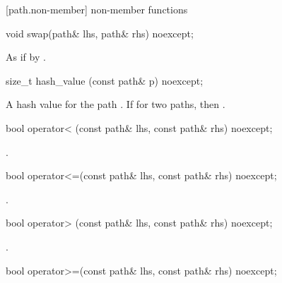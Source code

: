 [path.non-member]{ non-member functions}

\begin{itemdecl}
void swap(path& lhs, path& rhs) noexcept;
\end{itemdecl}

\begin{itemdescr}
\pnum
\effects As if by .
\end{itemdescr}

\begin{itemdecl}
size_t hash_value (const path& p) noexcept;
\end{itemdecl}

\begin{itemdescr}
\pnum
\returns A hash value for the path . If
  for two paths,  then .
\end{itemdescr}

\begin{itemdecl}
bool operator< (const path& lhs, const path& rhs) noexcept;
\end{itemdecl}

\begin{itemdescr}
\pnum
\returns {}.
\end{itemdescr}

\begin{itemdecl}
bool operator<=(const path& lhs, const path& rhs) noexcept;
\end{itemdecl}

\begin{itemdescr}
\pnum
\returns {}.
\end{itemdescr}

\begin{itemdecl}
bool operator> (const path& lhs, const path& rhs) noexcept;
\end{itemdecl}

\begin{itemdescr}
\pnum
\returns {}.
\end{itemdescr}

\begin{itemdecl}
bool operator>=(const path& lhs, const path& rhs) noexcept;
\end{itemdecl}

